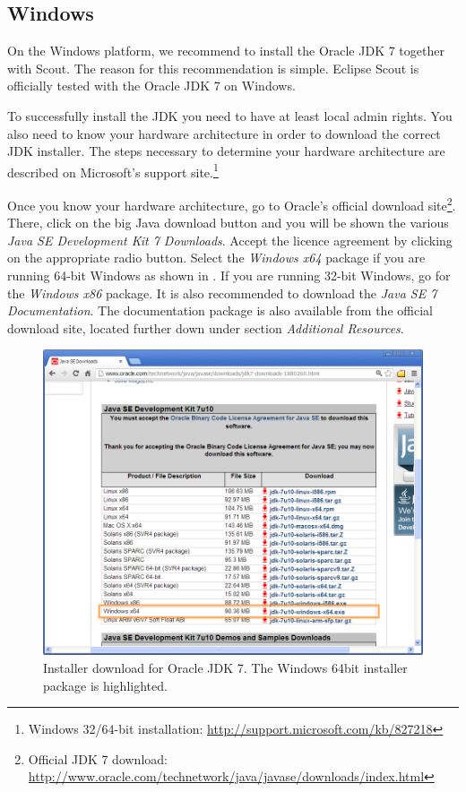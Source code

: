 \documentclass[a4paper,10pt,twoside]{book}
\begin{document}
\subsection{Windows}

On the Windows platform, we recommend to install the Oracle JDK 7 together with Scout. 
The reason for this recommendation is simple.
Eclipse Scout is officially tested with the Oracle JDK 7 on Windows.

To successfully install the JDK you need to have at least local admin rights.
You also need to know your hardware architecture in order to download the correct JDK installer. 
The steps necessary to determine your hardware architecture are described on Microsoft's support 
site.\footnote{Windows 32/64-bit installation: \url{http://support.microsoft.com/kb/827218}}

Once you know your hardware architecture, go to Oracle's official download 
site\footnote{Official JDK 7 download: \url{http://www.oracle.com/technetwork/java/javase/downloads/index.html}}.
There, click on the big Java download button and you will be shown the various \textit{Java SE Development Kit 7 Downloads}.
Accept the licence agreement by clicking on the appropriate radio button.
Select the \textit{Windows x64} package if you are running 64-bit Windows as shown in .
If you are running 32-bit Windows, go for the \textit{Windows x86} package.
It is also recommended to download the \textit{Java SE 7 Documentation}.
The documentation package is also available from the official download site, located further down under section \textit{Additional Resources}.

\begin{figure}
\includegraphics[width=15cm]{oracle_jdk_download.png}
\caption{Installer download for Oracle JDK 7. The Windows 64bit installer package is highlighted.}
\end{figure}
\end{document}
